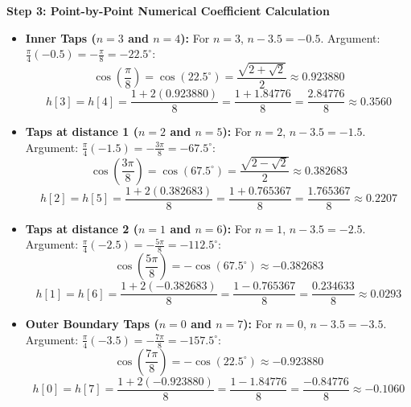 \documentclass[11pt,a4paper]{article}
\begin{document}
\noindent\textbf{Step 3: Point-by-Point Numerical Coefficient Calculation}
\begin{itemize}
    \item \textbf{Inner Taps ($n = 3$ and $n = 4$):}
    For $n=3$, $n - 3.5 = -0.5$. Argument: $\frac{\pi}{4}(-0.5) = -\frac{\pi}{8} = -22.5^\circ$:
    \begin{equation}
    \cos\left(\frac{\pi}{8}\right) = \cos(22.5^\circ) = \frac{\sqrt{2 + \sqrt{2}}}{2} \approx 0.923880
    \end{equation}
    \begin{equation}
    h[3] = h[4] = \frac{1 + 2(0.923880)}{8} = \frac{1 + 1.84776}{8} = \frac{2.84776}{8} \approx \mathbf{0.3560}
    \end{equation}
    \item \textbf{Taps at distance 1 ($n = 2$ and $n = 5$):}
    For $n=2$, $n - 3.5 = -1.5$. Argument: $\frac{\pi}{4}(-1.5) = -\frac{3\pi}{8} = -67.5^\circ$:
    \begin{equation}
    \cos\left(\frac{3\pi}{8}\right) = \cos(67.5^\circ) = \frac{\sqrt{2 - \sqrt{2}}}{2} \approx 0.382683
    \end{equation}
    \begin{equation}
    h[2] = h[5] = \frac{1 + 2(0.382683)}{8} = \frac{1 + 0.765367}{8} = \frac{1.765367}{8} \approx \mathbf{0.2207}
    \end{equation}
    \item \textbf{Taps at distance 2 ($n = 1$ and $n = 6$):}
    For $n=1$, $n - 3.5 = -2.5$. Argument: $\frac{\pi}{4}(-2.5) = -\frac{5\pi}{8} = -112.5^\circ$:
    \begin{equation}
    \cos\left(\frac{5\pi}{8}\right) = -\cos(67.5^\circ) \approx -0.382683
    \end{equation}
    \begin{equation}
    h[1] = h[6] = \frac{1 + 2(-0.382683)}{8} = \frac{1 - 0.765367}{8} = \frac{0.234633}{8} \approx \mathbf{0.0293}
    \end{equation}
    \item \textbf{Outer Boundary Taps ($n = 0$ and $n = 7$):}
    For $n=0$, $n - 3.5 = -3.5$. Argument: $\frac{\pi}{4}(-3.5) = -\frac{7\pi}{8} = -157.5^\circ$:
    \begin{equation}
    \cos\left(\frac{7\pi}{8}\right) = -\cos(22.5^\circ) \approx -0.923880
    \end{equation}
    \begin{equation}
    h[0] = h[7] = \frac{1 + 2(-0.923880)}{8} = \frac{1 - 1.84776}{8} = \frac{-0.84776}{8} \approx \mathbf{-0.1060}
    \end{equation}
\end{itemize}
\end{document}

